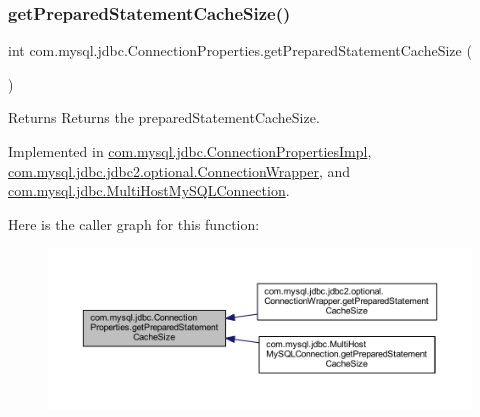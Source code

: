 \subsubsection{\texorpdfstring{get\+Prepared\+Statement\+Cache\+Size()}{getPreparedStatementCacheSize()}}
{\footnotesize\ttfamily int com.\+mysql.\+jdbc.\+Connection\+Properties.\+get\+Prepared\+Statement\+Cache\+Size (\begin{DoxyParamCaption}{ }\end{DoxyParamCaption})}

\begin{DoxyReturn}{Returns}
Returns the prepared\+Statement\+Cache\+Size. 
\end{DoxyReturn}


Implemented in \mbox{\hyperlink{classcom_1_1mysql_1_1jdbc_1_1_connection_properties_impl_abc559114d161a4bd627de320cc84de51}{com.\+mysql.\+jdbc.\+Connection\+Properties\+Impl}}, \mbox{\hyperlink{classcom_1_1mysql_1_1jdbc_1_1jdbc2_1_1optional_1_1_connection_wrapper_ad7e993d7bc7cbf1913a836cdcbbdc0dc}{com.\+mysql.\+jdbc.\+jdbc2.\+optional.\+Connection\+Wrapper}}, and \mbox{\hyperlink{classcom_1_1mysql_1_1jdbc_1_1_multi_host_my_s_q_l_connection_a6308b3767baa0f4cbf8eecdd7991533d}{com.\+mysql.\+jdbc.\+Multi\+Host\+My\+S\+Q\+L\+Connection}}.

Here is the caller graph for this function\+:\nopagebreak
\begin{figure}[H]
\begin{center}
\leavevmode
\includegraphics[width=350pt]{interfacecom_1_1mysql_1_1jdbc_1_1_connection_properties_ad0bf062f59dcc82790e2d539c3a79924_icgraph}
\end{center}
\end{figure}
\mbox{\label{interfacecom_1_1mysql_1_1jdbc_1_1_connection_properties_a4bcee0f0e555dcada01589d7b4168a4e}} 
